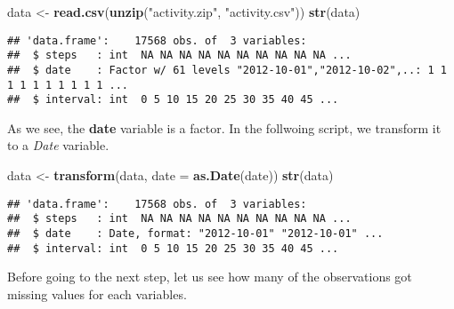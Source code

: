 \documentclass[]{article}
\newenvironment{Shaded}{\begin{snugshade}}{\end{snugshade}}
\newcommand{\KeywordTok}[1]{\textcolor[rgb]{0.13,0.29,0.53}{\textbf{#1}}}
\newcommand{\DataTypeTok}[1]{\textcolor[rgb]{0.13,0.29,0.53}{#1}}
\newcommand{\DecValTok}[1]{\textcolor[rgb]{0.00,0.00,0.81}{#1}}
\newcommand{\StringTok}[1]{\textcolor[rgb]{0.31,0.60,0.02}{#1}}
\newcommand{\OperatorTok}[1]{\textcolor[rgb]{0.81,0.36,0.00}{\textbf{#1}}}
\newcommand{\NormalTok}[1]{#1}
\begin{document}
\begin{Shaded}
\begin{Highlighting}[]
\NormalTok{data <-}\StringTok{ }\KeywordTok{read.csv}\NormalTok{(}\KeywordTok{unzip}\NormalTok{(}\StringTok{"activity.zip"}\NormalTok{, }\StringTok{"activity.csv"}\NormalTok{))}
\KeywordTok{str}\NormalTok{(data)}
\end{Highlighting}
\end{Shaded}

\begin{verbatim}
## 'data.frame':    17568 obs. of  3 variables:
##  $ steps   : int  NA NA NA NA NA NA NA NA NA NA ...
##  $ date    : Factor w/ 61 levels "2012-10-01","2012-10-02",..: 1 1 1 1 1 1 1 1 1 1 ...
##  $ interval: int  0 5 10 15 20 25 30 35 40 45 ...
\end{verbatim}

As we see, the \textbf{date} variable is a factor. In the follwoing
script, we transform it to a \emph{Date} variable.

\begin{Shaded}
\begin{Highlighting}[]
\NormalTok{data <-}\StringTok{ }\KeywordTok{transform}\NormalTok{(data, }\DataTypeTok{date =} \KeywordTok{as.Date}\NormalTok{(date))}
\KeywordTok{str}\NormalTok{(data)}
\end{Highlighting}
\end{Shaded}

\begin{verbatim}
## 'data.frame':    17568 obs. of  3 variables:
##  $ steps   : int  NA NA NA NA NA NA NA NA NA NA ...
##  $ date    : Date, format: "2012-10-01" "2012-10-01" ...
##  $ interval: int  0 5 10 15 20 25 30 35 40 45 ...
\end{verbatim}

Before going to the next step, let us see how many of the observations
got missing values for each variables.

\begin{Shaded}
\end{Shaded}
\end{document}
